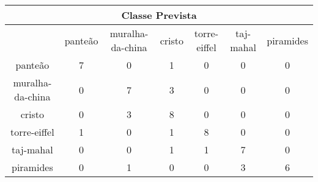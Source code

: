 \begin{tabular}{|c|c|c|c|c|c|c|}
\hline
\multicolumn{7}{|c|}{Classe Prevista}\\
\hline
 & panteão & muralha-da-china & cristo & torre-eiffel & taj-mahal & piramides\\
panteão & 7 & 0 & 1 & 0 & 0 & 0\\
muralha-da-china & 0 & 7 & 3 & 0 & 0 & 0\\
cristo & 0 & 3 & 8 & 0 & 0 & 0\\
torre-eiffel & 1 & 0 & 1 & 8 & 0 & 0\\
taj-mahal & 0 & 0 & 1 & 1 & 7 & 0\\
piramides & 0 & 1 & 0 & 0 & 3 & 6\\
\hline
\end{tabular}
